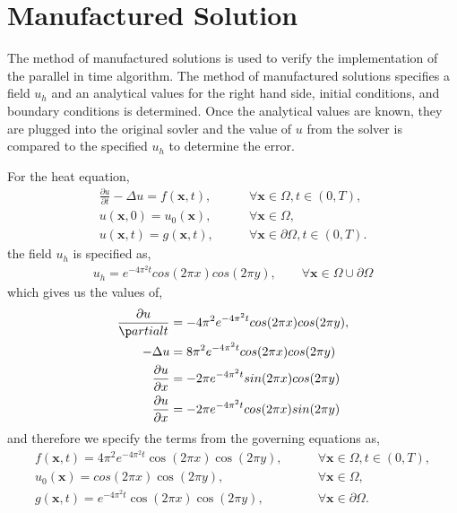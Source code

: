 \documentclass{article}
\begin{document}
\section{Manufactured Solution}
\label{sec:MFGSol}

The method of manufactured solutions is used to verify the implementation of the
parallel in time algorithm.
The method of manufactured solutions specifies a field $u_h$ and an
analytical values for the right hand side, initial conditions, and boundary
conditions is determined.
Once the analytical values are known, they are plugged into the original sovler
and the value of $u$ from the solver is compared to the specified $u_h$ to
determine the error.

For the heat equation,
\begin{align*}
  \frac{\partial u}{\partial t} - \Delta u = f(\boldsymbol{x},t), \qquad &\forall\boldsymbol{x}\in\Omega,t\in\left( 0,T \right), \\
  u(\boldsymbol{x},0) = u_0(\boldsymbol{x}), \qquad &\forall \boldsymbol{x}\in\Omega, \\
  u(\boldsymbol{x},t) = g(\boldsymbol{x},t), \qquad &\forall \boldsymbol{x}\in\partial\Omega,t\in\left( 0,T \right).
\end{align*}
the field $u_h$ is specified as,
\begin{align*}
  u_h = e^{-4\pi^2t}cos(2 \pi x)cos(2 \pi y), \qquad \forall \boldsymbol{x} \in \Omega \cup \partial\Omega
\end{align*}
which gives us the values of,
\begin{align*}
  \frac{\partial u}{\p artial t} &= -4 \pi^2 e^{-4\pi^2t}cos(2 \pi x)cos(2 \pi y), \\
  -\Delta u &= 8 \pi^2 e^{-4\pi^2t}cos(2 \pi x)cos(2 \pi y) \\
  \frac{\partial u}{\partial x} &= -2 \pi e^{-4\pi^2t}sin(2\pi x)cos(2\pi y) \\
  \frac{\partial u}{\partial x} &= -2 \pi e^{-4\pi^2t}cos(2\pi x)sin(2\pi y)
\end{align*}
and therefore we specify the terms from the governing equations as,
\begin{align*}
  f(\boldsymbol{x},t) = 4 \pi^2 e^{-4\pi^2t}\cos(2 \pi x)\cos(2 \pi y), \qquad&\forall\boldsymbol{x}\in\Omega,t\in\left( 0,T \right), \\
  u_0(\boldsymbol{x}) = cos(2 \pi x)\cos(2 \pi y), \qquad &\forall \boldsymbol{x}\in\Omega, \\
  g(\boldsymbol{x},t) = e^{-4\pi^2t}\cos(2 \pi x)\cos(2 \pi y), \qquad &\forall \boldsymbol{x} \in \partial\Omega.
\end{align*}
\end{document}
